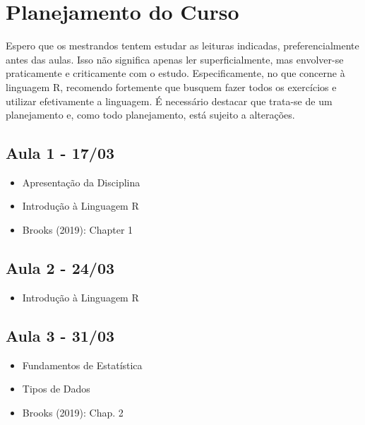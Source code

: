 \documentclass[11pt,]{article}
\providecommand{\tightlist}{%
  \setlength{\itemsep}{0pt}\setlength{\parskip}{0pt}}
\begin{document}
\hypertarget{planejamento-do-curso}{%
\section{Planejamento do Curso}\label{planejamento-do-curso}}

Espero que os mestrandos tentem estudar as leituras indicadas,
preferencialmente antes das aulas. Isso não significa apenas ler
superficialmente, mas envolver-se praticamente e criticamente com o
estudo. Especificamente, no que concerne à linguagem R, recomendo
fortemente que busquem fazer todos os exercícios e utilizar efetivamente
a linguagem. É necessário destacar que trata-se de um planejamento e,
como todo planejamento, está sujeito a alterações.

\hypertarget{aula-1---1703}{%
\subsection{Aula 1 - 17/03}\label{aula-1---1703}}

\begin{itemize}
\tightlist
\item
  Apresentação da Disciplina
\item
  Introdução à Linguagem R
\item
  Brooks (2019): Chapter 1
\end{itemize}

\hypertarget{aula-2---2403}{%
\subsection{Aula 2 - 24/03}\label{aula-2---2403}}

\begin{itemize}
\tightlist
\item
  Introdução à Linguagem R
\end{itemize}

\hypertarget{aula-3---3103}{%
\subsection{Aula 3 - 31/03}\label{aula-3---3103}}

\begin{itemize}
\tightlist
\item
  Fundamentos de Estatística
\item
  Tipos de Dados
\item
  Brooks (2019): Chap. 2
\end{itemize}
\end{document}
